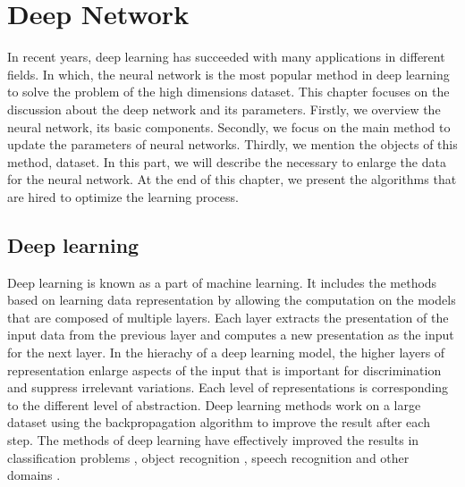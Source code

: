 \chapter{Deep Network}

In recent years, deep learning has succeeded with many applications in different fields. In which, the neural network is the most popular method in deep learning to solve the problem of the high dimensions dataset. This chapter focuses on the discussion about the deep network and its parameters. Firstly, we overview the neural network, its basic components. Secondly, we focus on the main method to update the parameters of neural networks. Thirdly, we mention the objects of this method, dataset. In this part, we will describe the necessary to enlarge the data for the neural network. At the end of this chapter, we present the algorithms that are hired to optimize the learning process.

\section{Deep learning}
Deep learning is known as a part of machine learning. It includes the methods based on learning data representation by allowing the computation on the models that are composed of multiple layers. Each layer extracts the presentation of the input data from the previous layer and computes a new presentation as the input for the next layer. In the hierachy of a deep learning model, the higher layers of representation enlarge aspects of the input that is important for discrimination and suppress irrelevant variations. Each level of representations is corresponding to the different level of abstraction. Deep learning methods work on a large dataset using the backpropagation algorithm to improve the result after each step. The methods of deep learning have effectively improved the results in classification problems \cite{}, object recognition \cite{}, speech recognition \cite{} and other domains \cite{}. 

